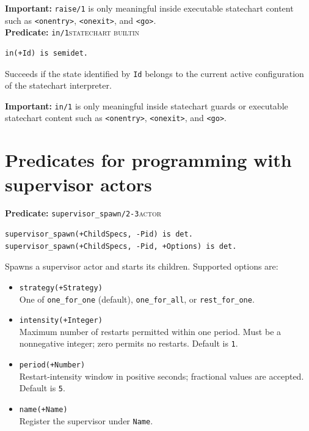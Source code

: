 \noindent \textbf{Important:} \texttt{raise/\allowbreak{}1} is only meaningful inside
executable statechart content such as \texttt{<onentry>},
\texttt{<onexit>}, and \texttt{<go>}.\\



\noindent \textbf{Predicate:} \texttt{in/\allowbreak{}1}\hfill\textsc{statechart builtin}

\begin{verbatim}
in(+Id) is semidet.
\end{verbatim}

\noindent Succeeds if the state identified by \texttt{Id} belongs to the
current active configuration of the statechart interpreter.

\medskip
\noindent \textbf{Important:} \texttt{in/\allowbreak{}1} is only meaningful inside
statechart guards or executable statechart content such as
\texttt{<onentry>}, \texttt{<onexit>}, and \texttt{<go>}.\\

\section{Predicates for programming with supervisor actors}\label{sec:supervisor-api}


\noindent \textbf{Predicate:} \texttt{supervisor\_\allowbreak{}spawn/\allowbreak{}2-3}\hfill\textsc{actor}

\begin{verbatim}
supervisor_spawn(+ChildSpecs, -Pid) is det.
supervisor_spawn(+ChildSpecs, -Pid, +Options) is det.
\end{verbatim}

\noindent Spawns a supervisor actor and starts its children. Supported options
are:

\begin{itemize}
\item
  \texttt{strategy(\allowbreak{}+Strategy)}\\
  One of \texttt{one\_\allowbreak{}for\_\allowbreak{}one} (default), \texttt{one\_\allowbreak{}for\_\allowbreak{}all}, or
  \texttt{rest\_\allowbreak{}for\_\allowbreak{}one}.
\item
  \texttt{intensity(\allowbreak{}+Integer)}\\
  Maximum number of restarts permitted within one period. Must be a
  nonnegative integer; zero permits no restarts. Default is \texttt{1}.
\item
  \texttt{period(\allowbreak{}+Number)}\\
  Restart-intensity window in positive seconds; fractional values are
  accepted. Default is \texttt{5}.
\item
  \texttt{name(\allowbreak{}+Name)}\\
  Register the supervisor under \texttt{Name}.
\end{itemize}

